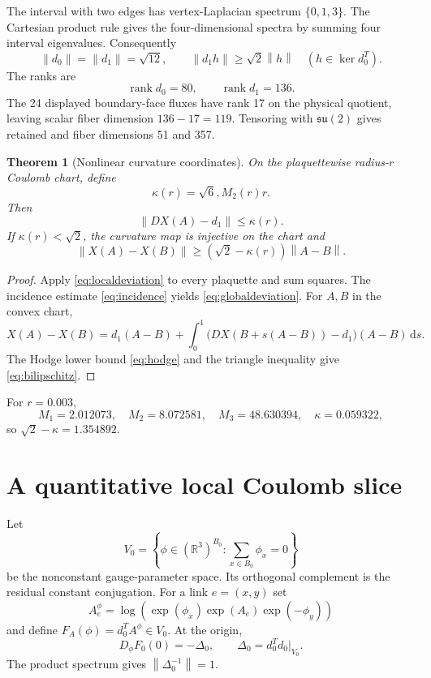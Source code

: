 \documentclass[11pt]{article}
\newtheorem{theorem}{Theorem}[section]
\theoremstyle{definition}
\newcommand{\su}{\mathfrak{su}(2)}
\newcommand{\R}{\mathbb{R}}
\newcommand{\norm}[1]{\left\lVert #1\right\rVert}
\newcommand{\dd}{\mathrm{d}}
\begin{document}
The interval with two edges has vertex-Laplacian spectrum $\{0,1,3\}$.
The Cartesian product rule gives the four-dimensional spectra by summing
four interval eigenvalues.  Consequently
\begin{equation}\label{eq:hodge}
 \norm{d_0}=\norm{d_1}=\sqrt{12},\qquad
 \norm{d_1h}\ge\sqrt2\norm h\quad(h\in\ker d_0^T).
\end{equation}
The ranks are
\[
 \operatorname{rank}d_0=80,\qquad
 \operatorname{rank}d_1=136.
\]
The 24 displayed boundary-face fluxes have rank 17 on the physical quotient,
leaving scalar fiber dimension $136-17=119$.  Tensoring with $\su$ gives
retained and fiber dimensions 51 and 357.

\begin{theorem}[Nonlinear curvature coordinates]\label{thm:bilipschitz}
On the plaquettewise radius-$r$ Coulomb chart, define
\[
 \kappa(r)=\sqrt6,M_2(r)r.
\]
Then
\begin{equation}\label{eq:globaldeviation}
 \norm{DX(A)-d_1}\le\kappa(r).
\end{equation}
If $\kappa(r)<\sqrt2$, the curvature map is injective on the chart and
\begin{equation}\label{eq:bilipschitz}
 \norm{X(A)-X(B)}\ge(\sqrt2-\kappa(r))\norm{A-B}.
\end{equation}
\end{theorem}

\begin{proof}
Apply \eqref{eq:localdeviation} to every plaquette and sum squares.  The
incidence estimate \eqref{eq:incidence} yields
\eqref{eq:globaldeviation}.  For $A,B$ in the convex chart,
\[
 X(A)-X(B)=d_1(A-B)+
 \int_0^1\bigl(DX(B+s(A-B))-d_1\bigr)(A-B)\,\dd s.
\]
The Hodge lower bound \eqref{eq:hodge} and the triangle inequality give
\eqref{eq:bilipschitz}.
\end{proof}

For $r=0.003$,
\[
 M_1=2.012073,\quad M_2=8.072581,\quad M_3=48.630394,\quad
 \kappa=0.059322,
\]
so $\sqrt2-\kappa=1.354892$.

\section{A quantitative local Coulomb slice}\label{sec:slice}

Let
\[
 V_0=\left\{\phi\in(\R^3)^{B_0}:\sum_{x\in B_0}\phi_x=0\right\}
\]
be the nonconstant gauge-parameter space.  Its orthogonal complement is the
residual constant conjugation.  For a link $e=(x,y)$ set
\begin{equation}\label{eq:gaugeaction}
 A_e^\phi=\log\left(\exp(\phi_x)\exp(A_e)\exp(-\phi_y)\right)
\end{equation}
and define $F_A(\phi)=d_0^TA^\phi\in V_0$.  At the origin,
\[
 D_\phi F_0(0)=-\Delta_0,\qquad \Delta_0=d_0^Td_0|_{V_0}.
\]
The product spectrum gives $\norm{\Delta_0^{-1}}=1$.
\end{document}

